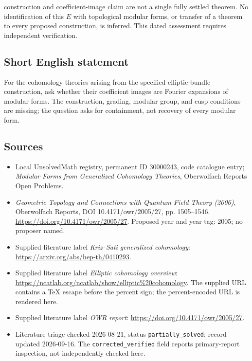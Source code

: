 \documentclass[11pt]{article}
\begin{document}
construction and coefficient-image claim are not a single fully settled theorem. No identification of this \(E\) with topological modular forms, or transfer of a theorem to every proposed construction, is inferred. This dated assessment requires independent verification.
\subsection{Short English statement}
For the cohomology theories arising from the specified elliptic-bundle construction, ask whether their coefficient images are Fourier expansions of modular forms. The construction, grading, modular group, and cusp conditions are missing; the question asks for containment, not recovery of every modular form.
\subsection{Sources}
\begin{itemize}\item Local UnsolvedMath registry, permanent ID 30000243, code catalogue entry; \emph{Modular Forms from Generalized Cohomology Theories}, Oberwolfach Reports Open Problems.\item \emph{Geometric Topology and Connections with Quantum Field Theory (2006)}, Oberwolfach Reports, DOI 10.4171/owr/2005/27, pp. 1505--1546. \url{https://doi.org/10.4171/owr/2005/27}. Proposed year and year tag: 2005; no proposer named.\item Supplied literature label \emph{Kriz--Sati generalized cohomology}: \url{https://arxiv.org/abs/hep-th/0410293}.\item Supplied literature label \emph{Elliptic cohomology overview}: \url{https://ncatlab.org/ncatlab/show/elliptic%20cohomology}. The supplied URL contains a TeX escape before the percent sign; the percent-encoded URL is rendered here.\item Supplied literature label \emph{OWR report}: \url{https://doi.org/10.4171/owr/2005/27}.\item Literature triage checked 2026-08-21, status \texttt{partially\_solved}; record updated 2026-09-16. The \texttt{corrected\_verified} field reports primary-report inspection, not independently checked here.\end{itemize}
\end{document}
